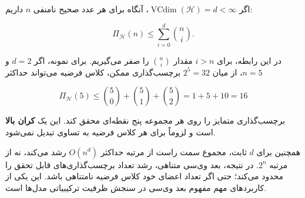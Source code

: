 \documentclass[12pt,a4paper]{article}
\begin{document}
اگر $\operatorname{VCdim}(\mathcal{H})=d<\infty$، آنگاه
برای هر عدد صحیح نامنفی $n$ داریم:

\[
\boxed{
\Pi_{\mathcal{H}}(n)
\leq\sum_{i=0}^{d}\binom{n}{i}.
}
\]

در این رابطه، برای $i>n$ مقدار $\binom{n}{i}$ را صفر می‌گیریم.
برای نمونه، اگر $d=2$ و $n=5$، از میان $2^5=32$
برچسب‌گذاری ممکن، کلاس فرضیه می‌تواند حداکثر

\[
\Pi_{\mathcal{H}}(5)
\leq \binom50+\binom51+\binom52
=1+5+10=16
\]

برچسب‌گذاری متمایز را روی هر مجموعه پنج نقطه‌ای
محقق کند. این یک \textbf{کران بالا} است و لزوماً
برای هر کلاس فرضیه به تساوی تبدیل نمی‌شود.

همچنین برای $d$ ثابت، مجموع سمت راست از مرتبه
حداکثر $O(n^d)$ رشد می‌کند، نه از مرتبه $2^n$.
در نتیجه، بعد وی‌سی متناهی، رشد تعداد
برچسب‌گذاری‌های قابل تحقق را محدود می‌کند؛
حتی اگر تعداد اعضای خود کلاس فرضیه نامتناهی باشد.
این یکی از کاربردهای مهم مفهوم بعد وی‌سی
در سنجش ظرفیت ترکیبیاتی مدل‌ها است.
\end{document}
